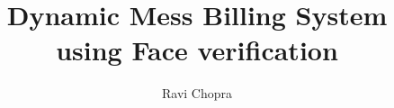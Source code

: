 \documentclass[defaultstyle,11pt]{thesis}
\title{Dynamic Mess Billing System using Face verification}
\author{Ravi Chopra}
\begin{document}








\nocite{*}		%

\end{document}
